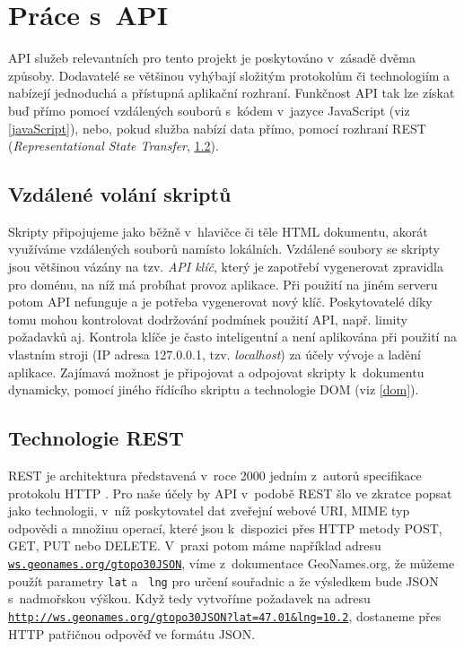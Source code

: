 \section{Práce s~API}\label{api}
API služeb relevantních pro tento projekt je poskytováno v~zásadě
dvěma způsoby. Dodavatelé se většinou vyhýbají složitým protokolům či
technologiím a nabízejí jednoduchá a přístupná aplikační rozhraní.
Funkčnost API tak lze získat buď přímo pomocí vzdálených souborů
s~kódem v~jazyce JavaScript (viz \ref{javaScript}), nebo, pokud služba
nabízí data přímo, pomocí rozhraní REST ({\it Representational State
Transfer}, \ref{rest}).

\subsection{Vzdálené volání skriptů}
Skripty připojujeme jako běžně v~hlavičce či těle HTML
dokumentu, akorát využíváme vzdálených souborů namísto lokálních.
Vzdálené soubory se skripty jsou většinou vázány na tzv. {\it API
klíč}, který je zapotřebí vygenerovat zpravidla pro doménu, na níž má
probíhat provoz aplikace. Při použití na jiném serveru potom API
nefunguje a je potřeba vygenerovat nový klíč. Poskytovatelé díky tomu
mohou kontrolovat dodržování podmínek použití API, např. limity
požadavků aj. Kontrola klíče je často inteligentní a není aplikována
při použití na vlastním stroji (IP adresa 127.0.0.1, tzv. {\it
localhost}) za účely vývoje a ladění aplikace. Zajímavá možnost je
připojovat a odpojovat skripty k~dokumentu dynamicky, pomocí jiného
řídícího skriptu a technologie DOM (viz \ref{dom}).

\subsection{Technologie REST}\label{rest}
REST je architektura představená v~roce 2000 jedním z~autorů
specifikace protokolu HTTP \cite{rest}. Pro naše účely by API
v~podobě REST šlo ve zkratce popsat jako technologii, v~níž poskytovatel dat
zveřejní webové URI, MIME typ odpovědi a množinu operací, které jsou k~dispozici
přes HTTP metody POST, GET, PUT nebo DELETE. V~praxi
potom máme například adresu {\tt \url{ws.geonames.org/gtopo30JSON}},
víme z~dokumentace GeoNames.org, že můžeme použít parametry {\tt lat} a {\tt
lng} pro určení souřadnic a že výsledkem bude JSON s~nadmořskou
výškou. Když tedy vytvoříme požadavek na adresu
{\tt \url{http://ws.geonames.org/gtopo30JSON?lat=47.01&lng=10.2}},
dostaneme přes HTTP patřičnou odpověď ve formátu JSON.

